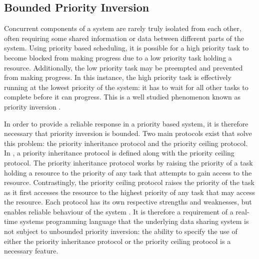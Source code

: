 \subsection{Bounded Priority Inversion}
Concurrent components of a system are rarely truly isolated from each other,
often requiring some shared information or data between different parts of the
system.  Using priority based scheduling, it is possible for a high priority
task to become blocked from making progress due to a low priority task holding
a resource. Additionally, the low priority task may be preempted and prevented
from making progress. In this instance, the high priority task is effectively
running at the lowest priority of the system: it has to wait for all other
tasks to complete before it can progress. This is a well studied phenomenon
known as priority inversion \cite{real-time-systems}.  
\par\bigskip\noindent
In
order to provide a reliable response in a priority based system, it is
therefore necessary that priority inversion is bounded.  Two main protocols
exist that solve this problem: the priority inheritance protocol and the
priority ceiling protocol.  In \cite{57058}, a priority inheritance protocol is
defined along with the priority ceiling protocol.  The priority inheritance
protocol works by raising the priority of a task holding a resource to the
priority of any task that attempts to gain access to the resource.
Contrastingly, the priority ceiling protocol raises the priority of the task as
it first accesses the resource to the highest priority of any task that may
access the resource.  Each protocol has its own respective strengths and
weaknesses, but enables reliable behaviour of the system \cite{mall2009real}.
It is therefore a requirement of a real-time systems programming language that
the underlying data sharing system is not subject to unbounded priority
inversion: the ability to specify the use of either the priority inheritance
protocol or the priority ceiling protocol is a necessary feature.  

